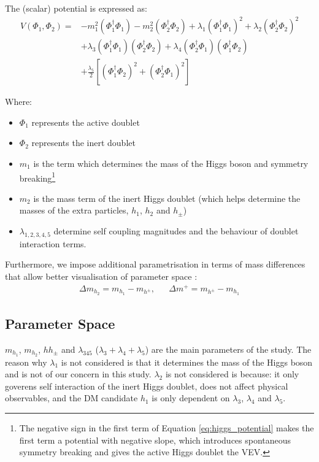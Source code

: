 \documentclass[12pt]{article}
\begin{document}
The (scalar) potential is expressed as:
\begin{equation}
    \begin{split}
        V(\Phi_1, \Phi_2) =& -m_1^2(\Phi_1^\dagger\Phi_1) - m_2^2(\Phi_2^\dagger\Phi_2) +
        \lambda_1(\Phi_1^\dagger\Phi_1)^2 + \lambda_2(\Phi_2^\dagger\Phi_2)^2 \\ 
        &+ \lambda_3(\Phi_1^\dagger\Phi_1)(\Phi_2^\dagger\Phi_2) + \lambda_4(\Phi_2^\dagger\Phi_1)(\Phi_1^\dagger\Phi_2)\\ 
        &+ \frac{\lambda_5}{2}[(\Phi_1^\dagger\Phi_2)^2 + (\Phi_2^\dagger\Phi_1)^2]
        \end{split}
        \label{eq:higgs_potential}
\end{equation}

Where:
\begin{itemize}
    \item $\Phi_1$ represents the active doublet
    \item $\Phi_2$ represents the inert doublet
    \item $m_1$ is the term which determines the mass of the Higgs boson and symmetry breaking\footnote{The negative sign in the first term of Equation \ref{eq:higgs_potential} makes the first term a potential with negative slope, which introduces spontaneous symmetry breaking and gives the active Higgs doublet the VEV.}
    \item $m_2$ is the mass term of the inert Higgs doublet (which helps determine the masses of the extra particles, $h_1$, $h_2$ and $h_\pm$)
    \item $\lambda_{1, 2, 3, 4, 5}$ determine self coupling magnitudes and the behaviour of doublet interaction terms.
\end{itemize}

Furthermore, we impose additional parametrisation in terms of mass differences that allow better visualisation of parameter space \cite{Belyaev_2022}:
\begin{align}
    \Delta m_{h_2} = m_{h_1} - m_{h^\pm},&&\Delta m^+ = m_{h^\pm} - m_{h_1}
\end{align}

\subsection{Parameter Space}
$m_{h_1}$, $m_{h_2}$, $h{h_\pm}$ and $\lambda_{345}$ ($\lambda_3 + \lambda_4 + \lambda_5$) are the main parameters of the study. The reason why $\lambda_1$ is not considered is that it determines the mass of the Higgs boson and is not of our concern in this study. $\lambda_2$ is not considered is because: it only goverens self interaction of the inert Higgs doublet, does not affect physical observables, and the DM candidate $h_1$ is only dependent on $\lambda_3$, $\lambda_4$ and $\lambda_5$.
\end{document}
